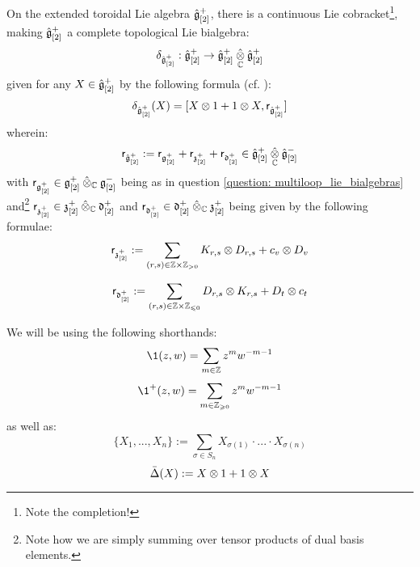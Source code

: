         \begin{corollary} \label{coro: extended_toroidal_lie_bialgebras}
            On the extended toroidal Lie algebra $\hat{\mathfrak{g}}_{[2]}^+$, there is a continuous Lie cobracket\footnote{Note the completion!}, making $\hat{\mathfrak{g}}_{[2]}^+$ a complete topological Lie bialgebra:
                $$\delta_{\hat{\g}_{[2]}^+}: \hat{\g}_{[2]}^+ \to \hat{\g}_{[2]}^+ \hattensor_{\bbC} \hat{\g}_{[2]}^+$$
            given for any $X \in \hat{\mathfrak{g}}_{[2]}^+$ by the following formula (cf. \cite{etingof_kazhdan_quantisation_1}):
                $$\delta_{\hat{\g}_{[2]}^+}(X) = [ X \tensor 1 + 1 \tensor X, \sfr_{\hat{\g}_{[2]}^+} ]$$
            wherein:
                $$\sfr_{\hat{\g}_{[2]}^+} := \sfr_{\g_{[2]}^+} + \sfr_{\z_{[2]}^+} + \sfr_{\d_{[2]}^+} \in \hat{\g}_{[2]}^+ \hattensor_{\bbC} \hat{\g}_{[2]}^-$$
            with $\sfr_{\g_{[2]}^+} \in \g_{[2]}^+ \hattensor_{\bbC} \g_{[2]}^-$ being as in question \ref{question: multiloop_lie_bialgebras} and\footnote{Note how we are simply summing over tensor products of dual basis elements.} $\sfr_{\z_{[2]}^+} \in \z_{[2]}^+ \hattensor_{\bbC} \d_{[2]}^+$ and $\sfr_{\d_{[2]}^+} \in \d_{[2]}^+ \hattensor_{\bbC} \z_{[2]}^+$ being given by the following formulae:
                $$\sfr_{\z_{[2]}^+} := \sum_{(r, s) \in \Z \x \Z_{> 0}} K_{r, s} \tensor D_{r, s} + c_v \tensor D_v$$
                
                $$\sfr_{\d_{[2]}^+} := \sum_{(r, s) \in \Z \x \Z_{\leq 0}} D_{r, s} \tensor K_{r, s} + D_t \tensor c_t$$
        \end{corollary}
    
        \begin{convention}
            We will be using the following shorthands:
                $$\1(z, w) = \sum_{m \in \Z} z^m w^{-m - 1}$$
                $$\1^+(z, w) = \sum_{m \in \Z_{\geq 0}} z^m w^{-m - 1}$$
            as well as:
                $$\{ X_1, ..., X_n \} := \sum_{\sigma \in S_n} X_{\sigma(1)} \cdot ... \cdot X_{\sigma(n)}$$
                $$\bar{\Delta}(X) := X \tensor 1 + 1 \tensor X$$
        \end{convention}


